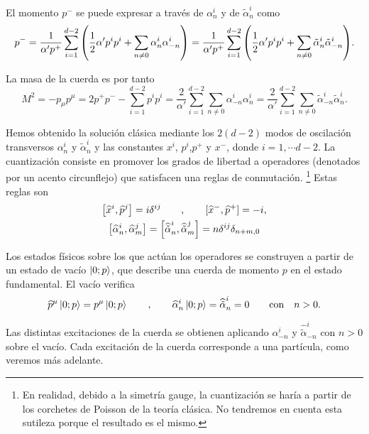 El momento $p^-$ se puede expresar a través de $\alpha^i_n$ y de $\tilde \alpha^i_n$ como
\begin{equation}
  p^- = \frac{1}{\alpha' p^+}\sum_{i=1}^{d-2} \qty(\frac{1}{2}\alpha'p^i p^i +\sum_{n\neq0}\alpha_n^i\alpha_{-n}^i) 
   = \frac{1}{\alpha' p^+}\sum_{i=1}^{d-2} \qty(\frac{1}{2}\alpha'p^i p^i +\sum_{n\neq0}\tilde \alpha_n^i\tilde \alpha_{-n}^i) .
\end{equation}

La masa de la cuerda es por tanto
\begin{equation}
  M^2=-p_\mu p^\mu = 2p^+p^- - \sum_{i=1}^{d-2} p^i p^i = 
  \frac{2}{\alpha'}\sum_{i=1}^{d-2} \sum_{n\neq 0} \alpha_{-n}^i \alpha_n^i
  =\frac{2}{\alpha'}\sum_{i=1}^{d-2} \sum_{n\neq 0}\tilde \alpha_{-n}^i \tilde\alpha_n^i.
  \label{eq:mass}
\end{equation}

Hemos obtenido la solución clásica mediante los $2(d-2)$ modos de oscilación transversos 
$\alpha^i_n$ y $\tilde \alpha_n^i$ y las constantes $x^i$, $p^i$,$p^+$ y $x^-$, donde $i=1,\cdots d-2$.
La cuantización consiste en promover los grados de libertad a operadores (denotados
por un acento circunflejo) que satisfacen una reglas de conmutación.
\footnote{En realidad, debido a la simetría gauge, la cuantización se haría a partir de los
corchetes de Poisson de la teoría clásica. No tendremos en cuenta esta sutileza porque el
resultado es el mismo.}
Estas reglas son
\begin{equation}
  \begin{gathered}
    \qty[\widehat x^i,\widehat p^j] = i\delta^{ij}\qquad , \qquad [\widehat x^-,\widehat p^+] = -i,\\
    \qty[\widehat \alpha_n^i,\widehat \alpha_m^j]= \qty[\widehat {\tilde \alpha}_n^i,\widehat {\tilde \alpha}_m^j]= n \delta^{ij}\delta_{n+m,0}
  \end{gathered}
\end{equation}

Los estados físicos sobre los que actúan los operadores se construyen a partir de un estado 
de vacío $\ket{0;p}$, que describe una cuerda de momento $p$ en el estado fundamental.
El vacío verifica
\begin{equation}
  \widehat p^\mu \ket{0;p} = p^\mu \ket{0;p} \qquad, \qquad \widehat \alpha^i_n\ket{0;p}=\widehat {\tilde\alpha}^i_n = 0 \qquad \text{con} \quad n>0.
\end{equation}

Las distintas excitaciones de la cuerda se obtienen aplicando $\alpha_{-n}^i$ y $\widehat{\tilde\alpha}_{-n}^i$
con $n>0$ sobre el vacío.
Cada excitación de la cuerda corresponde a una partícula, como veremos más adelante.

